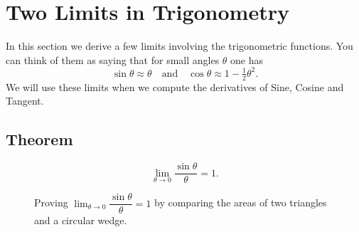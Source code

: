 \noproblemfont
\section{Two Limits in Trigonometry}
\label{sec:trigLimit}

In this section we derive a few limits involving the trigonometric
functions.  You can think of them as saying that for small angles $\theta$
one has
\begin{equation}
  \sin\theta \approx \theta\quad\text{and}\quad \cos\theta\approx 1-\tfrac12
  \theta^2.
  \label{eq:03sine-theta-is-roughly-theta}
\end{equation}
We will use these limits when we compute the derivatives of Sine, Cosine
and Tangent.

\subsection*{Theorem}%
\begin{equation}
  \lim_{\theta\to 0}\frac{\sin\theta}{\theta} = 1 .
  \label{eq:03trig-limit}
\end{equation}

\begin{figure}[t]
  \caption{Proving $\lim_{\theta\to 0} \dfrac{\sin \theta}{\theta}
    = 1$ by comparing the areas of two triangles and a circular wedge. }
  \label{fig:sintheta-almost-theta}
\end{figure}

